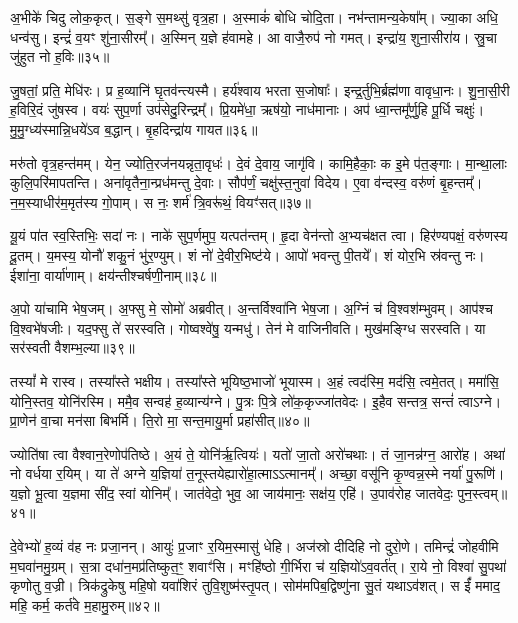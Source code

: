 अ॒भीके॑ चिदु लोक॒कृत्।
स॒ङ्गे स॒मथ्सु॑ वृत्र॒हा।
अ॒स्माकं॑ बोधि चोदि॒ता।
नभ॑न्तामन्य॒केषा᳚म्।
ज्या॒का अधि॒ धन्व॑सु।
इन्द्रं॑ व॒यꣳ शु॑ना॒सीरम्᳚।
अ॒स्मिन् य॒ज्ञे ह॑वामहे।
आ वाजै॒रुप॑ नो गमत्।
इन्द्रा॑य॒ शुना॒सीरा॑य।
स्रु॒चा जु॑हुत नो ह॒विः॥३५॥\ip

जु॒षतां॒ प्रति॒ मेधि॑रः।
प्र ह॒व्यानि॑ घृ॒तव॑न्त्यस्मै।
हर्य॑श्वाय भरता स॒जोषाः᳚।
इन्द्र॒र्तुभि॒र्ब्रह्म॑णा वावृधा॒नः।
शु॒ना॒सी॒री ह॒विरि॒दं जु॑षस्व।
वयः॑ सुप॒र्णा उप॑सेदु॒रिन्द्रम्᳚।
प्रि॒यमे॑धा॒ ऋष॑यो॒ नाध॑मानाः।
अप॑ ध्वा॒न्तमू᳚र्णु॒हि पू॒र्धि चक्षुः॑।
मु॒मु॒ग्ध्य॑स्मान्नि॒धये॑ऽव ब॒द्धान्।
बृ॒हदिन्द्रा॑य गायत॥३६॥\ip

मरु॑तो वृत्र॒हन्त॑मम्।
येन॒ ज्योति॒रज॑नयन्नृता॒वृधः॑।
दे॒वं दे॒वाय॒ जागृ॑वि।
कामि॒हैकाः॒ क इ॒मे प॑त॒ङ्गाः।
मा॒न्था॒लाः कुलि॒परि॑मापतन्ति।
अना॑वृतैना॒न्प्रध॑मन्तु दे॒वाः।
सौप॑र्णं॒ चक्षु॑स्त॒नुवा॑ विदेय।
ए॒वा व॑न्दस्व॒ वरु॑णं बृ॒हन्तम्᳚।
न॒म॒स्याधीर॑म॒मृत॑स्य गो॒पाम्।
स नः॒ शर्म॑ त्रि॒वरू॑थं॒ वियꣳ॑सत्॥३७॥\ip

यू॒यं पा॑त स्व॒स्तिभिः॒ सदा॑ नः।
नाके॑ सुप॒र्णमुप॒ यत्पत॑न्तम्।
हृ॒दा वेन॑न्तो अ॒भ्यच॑क्षत त्वा।
हिर॑ण्यपक्षं॒ वरु॑णस्य दू॒तम्।
य॒मस्य॒ योनौ॑ शकु॒नं भु॑र॒ण्युम्।
शं नो॑ दे॒वीर॒भिष्ट॑ये।
आपो॑ भवन्तु पी॒तये᳚।
शं योर॒भि स्र॑वन्तु नः।
ईशा॑ना॒ वार्या॑णाम्।
क्षय॑न्तीश्चर्\mbox{}षणी॒नाम्॥३८॥\ip

अ॒पो या॑चामि भेष॒जम्।
अ॒फ्सु मे॒ सोमो॑ अब्रवीत्।
अ॒न्तर्विश्वा॑नि भेष॒जा।
अ॒ग्निं च॑ वि॒श्वश॑म्भुवम्।
आप॑श्च वि॒श्वभे॑षजीः।
यद॒फ्सु ते॑ सरस्वति।
गोष्वश्वे॑षु॒ यन्मधु॑।
तेन॑ मे वाजिनीवति।
मुख॑मङ्ग्धि सरस्वति।
या सर॑स्वती वैशम्भ॒ल्या॥३९॥\ip

तस्यां᳚ मे रास्व।
तस्या᳚स्ते भक्षीय।
तस्या᳚स्ते भूयिष्ठ॒भाजो॑ भूयास्म।
अ॒हं त्वद॑स्मि॒ मद॑सि॒ त्वमे॒तत्।
ममा॑सि॒ योनि॒स्तव॒ योनि॑रस्मि।
ममै॒व सन्वह॑ ह॒व्यान्य॑ग्ने।
पु॒त्रः पि॒त्रे लो॑क॒कृज्जा॑तवेदः।
इ॒हैव सन्तत्र॒ सन्तं॑ त्वा\-ऽग्ने।
प्रा॒णेन॑ वा॒चा मन॑सा बिभर्मि।
ति॒रो मा॒ सन्त॒मायु॒र्मा प्रहा॑सीत्॥४०॥\ip

ज्योति॑षा त्वा वैश्वान॒रेणोप॑तिष्ठे।
अ॒यं ते॒ योनि॑र्\mbox{}ऋ॒त्वियः॑।
यतो॑ जा॒तो अरो॑चथाः।
तं जा॒नन्न॑ग्न॒ आरो॑ह।
अथा॑ नो वर्धया र॒यिम्।
या ते॑ अग्ने य॒ज्ञिया॑ त॒नूस्तयेह्यारो॑हा॒त्मा\-ऽऽत्मानम्᳚।
अच्छा॒ वसू॑नि कृ॒ण्वन्न॒स्मे नर्या॑ पु॒रूणि॑।
य॒ज्ञो भू॒त्वा य॒ज्ञमा सी॑द॒ स्वां योनिम्᳚।
जात॑वेदो॒ भुव॒ आ जाय॑मानः॒ सक्ष॑य॒ एहि॑।
उ॒पाव॑रोह जातवेदः॒ पुन॒स्त्वम्॥४१॥\ip

दे॒वेभ्यो॑ ह॒व्यं व॑ह नः प्रजा॒नन्।
आयुः॑ प्र॒जाꣳ र॒यिम॒स्मासु॑ धेहि।
अज॑स्रो दीदिहि नो दुरो॒णे।
तमिन्द्रं॑ जोहवीमि म॒घवा॑नमु॒ग्रम्।
स॒त्रा दधा॑न॒मप्र॑तिष्कुत॒ꣳ॒ शवाꣳ॑सि।
मꣳहि॑ष्ठो गी॒र्भिरा च॑ य॒ज्ञियो॑\-ऽव॒वर्त॑त्।
रा॒ये नो॒ विश्वा॑ सु॒पथा॑ कृणोतु व॒ज्री।
त्रिक॑द्रुकेषु महि॒षो यवा॑शिरं तुवि॒शुष्म॑स्तृ॒पत्।
सोम॑मपिब॒द्विष्णु॑ना सु॒तं यथा\-ऽव॑शत्।
स ईं᳚ ममाद॒ महि॒ कर्म॒ कर्त॑वे म॒हामु॒रुम्॥४२॥\ip

